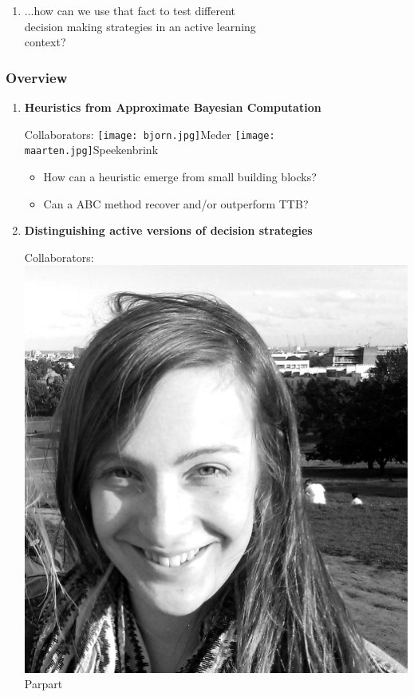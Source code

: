 \documentclass{beamer}
\begin{document}
\begin{frame}
\begin{enumerate}
\item ...how can we use that fact to test different\\ decision making strategies in an active learning\\
context?
\end{enumerate}
\end{frame}


\begin{frame}
 \frametitle{Overview}
 \begin{enumerate}
\item \textbf{Heuristics from Approximate Bayesian Computation}\\
\begin{center}
Collaborators:
\texttt{[image: bjorn.jpg]}Meder\hspace{0.5cm}
\texttt{[image: maarten.jpg]}Speekenbrink\hspace{0.5cm}
\end{center}
\begin{itemize}
\item How can a heuristic emerge from small building blocks?
\item Can a ABC method recover and/or outperform TTB?
\end{itemize}
\item \textbf{Distinguishing active versions of decision strategies}\\
\begin{center}
Collaborators:
\includegraphics[scale=0.013]{paula.jpg}Parpart\hspace{0.2cm}

\end{center}
\end{enumerate}
\end{frame}
\end{document}
